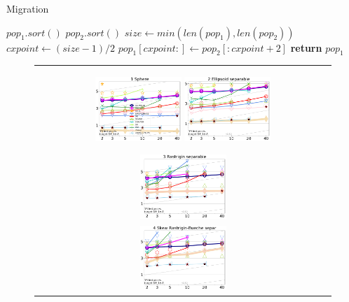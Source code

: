 \documentclass[runningheads]{llncs}
\begin{document}
\begin{algorithm}
    \caption{Migration}
    \label{alg:migration}
    \begin{algorithmic}[1]
            \State $pop_1.sort()$
            \State $pop_2.sort()$
            \State $size\gets min(len(pop_1), len(pop_2))$
            \State $cxpoint\gets (size-1)/2$
            \State $pop_1[cxpoint:]\gets pop_2[:cxpoint+2]$
            \State \textbf{return} $pop_1$
        \EndProcedure 
    \end{algorithmic}
\end{algorithm}
%
\begin{figure}[h!tb]
  \begin{tabular}
      {c@{\hspace*{-0.00001\textwidth}}
      }
     
  \includegraphics[width=0.30\textwidth]{ppfigs_f001}
  \includegraphics[width=0.30\textwidth]{ppfigs_f002}

  \includegraphics[width=0.30\textwidth]{ppfigs_f003}\\
  \includegraphics[width=0.30\textwidth]{ppfigs_f004}
  

\end{tabular}
\end{figure}
\end{document}
